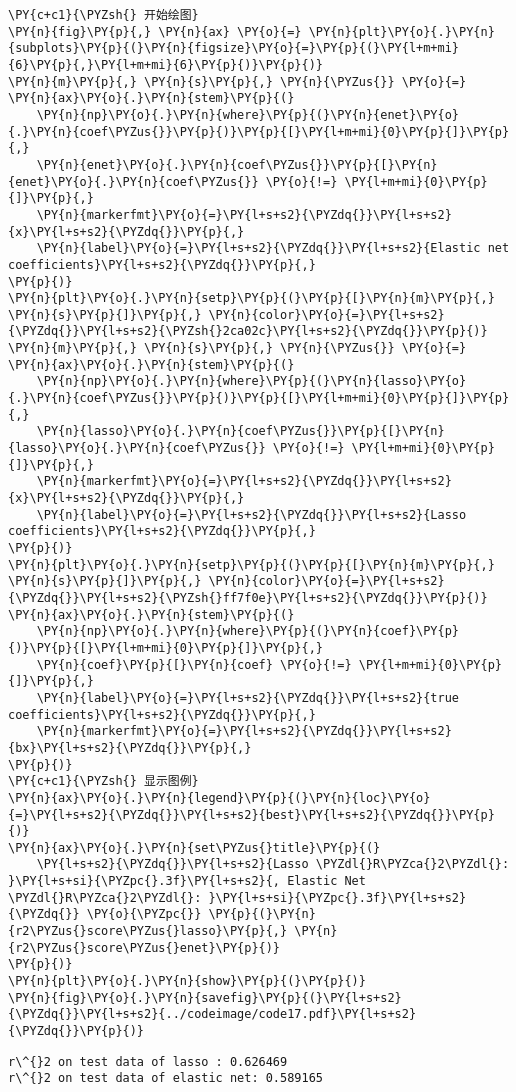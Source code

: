 \begin{Verbatim}[commandchars=\\\{\}]
\PY{c+c1}{\PYZsh{} 开始绘图}
\PY{n}{fig}\PY{p}{,} \PY{n}{ax} \PY{o}{=} \PY{n}{plt}\PY{o}{.}\PY{n}{subplots}\PY{p}{(}\PY{n}{figsize}\PY{o}{=}\PY{p}{(}\PY{l+m+mi}{6}\PY{p}{,}\PY{l+m+mi}{6}\PY{p}{)}\PY{p}{)}
\PY{n}{m}\PY{p}{,} \PY{n}{s}\PY{p}{,} \PY{n}{\PYZus{}} \PY{o}{=} \PY{n}{ax}\PY{o}{.}\PY{n}{stem}\PY{p}{(}
    \PY{n}{np}\PY{o}{.}\PY{n}{where}\PY{p}{(}\PY{n}{enet}\PY{o}{.}\PY{n}{coef\PYZus{}}\PY{p}{)}\PY{p}{[}\PY{l+m+mi}{0}\PY{p}{]}\PY{p}{,}
    \PY{n}{enet}\PY{o}{.}\PY{n}{coef\PYZus{}}\PY{p}{[}\PY{n}{enet}\PY{o}{.}\PY{n}{coef\PYZus{}} \PY{o}{!=} \PY{l+m+mi}{0}\PY{p}{]}\PY{p}{,}
    \PY{n}{markerfmt}\PY{o}{=}\PY{l+s+s2}{\PYZdq{}}\PY{l+s+s2}{x}\PY{l+s+s2}{\PYZdq{}}\PY{p}{,}
    \PY{n}{label}\PY{o}{=}\PY{l+s+s2}{\PYZdq{}}\PY{l+s+s2}{Elastic net coefficients}\PY{l+s+s2}{\PYZdq{}}\PY{p}{,}
\PY{p}{)}
\PY{n}{plt}\PY{o}{.}\PY{n}{setp}\PY{p}{(}\PY{p}{[}\PY{n}{m}\PY{p}{,} \PY{n}{s}\PY{p}{]}\PY{p}{,} \PY{n}{color}\PY{o}{=}\PY{l+s+s2}{\PYZdq{}}\PY{l+s+s2}{\PYZsh{}2ca02c}\PY{l+s+s2}{\PYZdq{}}\PY{p}{)}
\PY{n}{m}\PY{p}{,} \PY{n}{s}\PY{p}{,} \PY{n}{\PYZus{}} \PY{o}{=} \PY{n}{ax}\PY{o}{.}\PY{n}{stem}\PY{p}{(}
    \PY{n}{np}\PY{o}{.}\PY{n}{where}\PY{p}{(}\PY{n}{lasso}\PY{o}{.}\PY{n}{coef\PYZus{}}\PY{p}{)}\PY{p}{[}\PY{l+m+mi}{0}\PY{p}{]}\PY{p}{,}
    \PY{n}{lasso}\PY{o}{.}\PY{n}{coef\PYZus{}}\PY{p}{[}\PY{n}{lasso}\PY{o}{.}\PY{n}{coef\PYZus{}} \PY{o}{!=} \PY{l+m+mi}{0}\PY{p}{]}\PY{p}{,}
    \PY{n}{markerfmt}\PY{o}{=}\PY{l+s+s2}{\PYZdq{}}\PY{l+s+s2}{x}\PY{l+s+s2}{\PYZdq{}}\PY{p}{,}
    \PY{n}{label}\PY{o}{=}\PY{l+s+s2}{\PYZdq{}}\PY{l+s+s2}{Lasso coefficients}\PY{l+s+s2}{\PYZdq{}}\PY{p}{,}
\PY{p}{)}
\PY{n}{plt}\PY{o}{.}\PY{n}{setp}\PY{p}{(}\PY{p}{[}\PY{n}{m}\PY{p}{,} \PY{n}{s}\PY{p}{]}\PY{p}{,} \PY{n}{color}\PY{o}{=}\PY{l+s+s2}{\PYZdq{}}\PY{l+s+s2}{\PYZsh{}ff7f0e}\PY{l+s+s2}{\PYZdq{}}\PY{p}{)}
\PY{n}{ax}\PY{o}{.}\PY{n}{stem}\PY{p}{(}
    \PY{n}{np}\PY{o}{.}\PY{n}{where}\PY{p}{(}\PY{n}{coef}\PY{p}{)}\PY{p}{[}\PY{l+m+mi}{0}\PY{p}{]}\PY{p}{,}
    \PY{n}{coef}\PY{p}{[}\PY{n}{coef} \PY{o}{!=} \PY{l+m+mi}{0}\PY{p}{]}\PY{p}{,}
    \PY{n}{label}\PY{o}{=}\PY{l+s+s2}{\PYZdq{}}\PY{l+s+s2}{true coefficients}\PY{l+s+s2}{\PYZdq{}}\PY{p}{,}
    \PY{n}{markerfmt}\PY{o}{=}\PY{l+s+s2}{\PYZdq{}}\PY{l+s+s2}{bx}\PY{l+s+s2}{\PYZdq{}}\PY{p}{,}
\PY{p}{)}
\PY{c+c1}{\PYZsh{} 显示图例}
\PY{n}{ax}\PY{o}{.}\PY{n}{legend}\PY{p}{(}\PY{n}{loc}\PY{o}{=}\PY{l+s+s2}{\PYZdq{}}\PY{l+s+s2}{best}\PY{l+s+s2}{\PYZdq{}}\PY{p}{)}
\PY{n}{ax}\PY{o}{.}\PY{n}{set\PYZus{}title}\PY{p}{(}
    \PY{l+s+s2}{\PYZdq{}}\PY{l+s+s2}{Lasso \PYZdl{}R\PYZca{}2\PYZdl{}: }\PY{l+s+si}{\PYZpc{}.3f}\PY{l+s+s2}{, Elastic Net \PYZdl{}R\PYZca{}2\PYZdl{}: }\PY{l+s+si}{\PYZpc{}.3f}\PY{l+s+s2}{\PYZdq{}} \PY{o}{\PYZpc{}} \PY{p}{(}\PY{n}{r2\PYZus{}score\PYZus{}lasso}\PY{p}{,} \PY{n}{r2\PYZus{}score\PYZus{}enet}\PY{p}{)}
\PY{p}{)}
\PY{n}{plt}\PY{o}{.}\PY{n}{show}\PY{p}{(}\PY{p}{)}
\PY{n}{fig}\PY{o}{.}\PY{n}{savefig}\PY{p}{(}\PY{l+s+s2}{\PYZdq{}}\PY{l+s+s2}{../codeimage/code17.pdf}\PY{l+s+s2}{\PYZdq{}}\PY{p}{)}
\end{Verbatim}

\begin{Verbatim}[commandchars=\\\{\}]
r\^{}2 on test data of lasso : 0.626469
r\^{}2 on test data of elastic net: 0.589165
\end{Verbatim}

